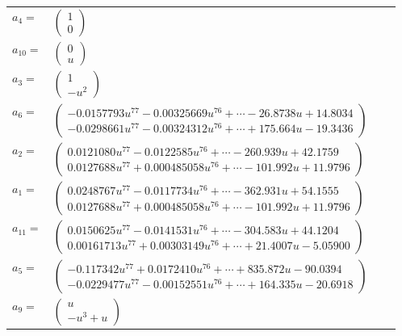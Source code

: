 \documentclass[1p]{elsarticle_modified}
\theoremstyle{definition}
\begin{document}
\begin{tabular}{m{7pt} m{180pt} m{7pt} m{180pt} }
\flushright $a_{4}=$&$\begin{pmatrix}1\\0\end{pmatrix}$ \\
\flushright $a_{10}=$&$\begin{pmatrix}0\\u\end{pmatrix}$ \\
\flushright $a_{3}=$&$\begin{pmatrix}1\\- u^2\end{pmatrix}$ \\
\flushright $a_{6}=$&$\begin{pmatrix}-0.0157793 u^{77}-0.00325669 u^{76}+\cdots-26.8738 u+14.8034\\-0.0298661 u^{77}-0.00324312 u^{76}+\cdots+175.664 u-19.3436\end{pmatrix}$ \\
\flushright $a_{2}=$&$\begin{pmatrix}0.0121080 u^{77}-0.0122585 u^{76}+\cdots-260.939 u+42.1759\\0.0127688 u^{77}+0.000485058 u^{76}+\cdots-101.992 u+11.9796\end{pmatrix}$ \\
\flushright $a_{1}=$&$\begin{pmatrix}0.0248767 u^{77}-0.0117734 u^{76}+\cdots-362.931 u+54.1555\\0.0127688 u^{77}+0.000485058 u^{76}+\cdots-101.992 u+11.9796\end{pmatrix}$ \\
\flushright $a_{11}=$&$\begin{pmatrix}0.0150625 u^{77}-0.0141531 u^{76}+\cdots-304.583 u+44.1204\\0.00161713 u^{77}+0.00303149 u^{76}+\cdots+21.4007 u-5.05900\end{pmatrix}$ \\
\flushright $a_{5}=$&$\begin{pmatrix}-0.117342 u^{77}+0.0172410 u^{76}+\cdots+835.872 u-90.0394\\-0.0229477 u^{77}-0.00152551 u^{76}+\cdots+164.335 u-20.6918\end{pmatrix}$ \\
\flushright $a_{9}=$&$\begin{pmatrix}u\\- u^3+u\end{pmatrix}$ \\

\end{tabular}
\end{document}
